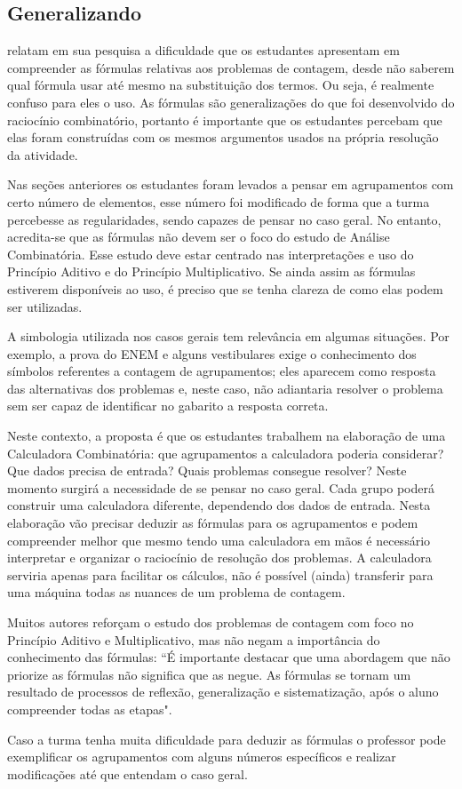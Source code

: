\clearpage
\def\currentcolor{session3}
\begin{texto}
{
\subsection{Generalizando}\small
\cite{Renan} relatam em sua pesquisa a dificuldade que os estudantes apresentam em compreender as fórmulas relativas aos problemas de contagem, desde não saberem qual fórmula usar até mesmo na substituição dos termos. Ou seja, é realmente confuso para eles o uso. As fórmulas são generalizações do que foi desenvolvido do raciocínio combinatório, portanto é importante que os estudantes percebam que elas foram construídas com os mesmos argumentos usados na própria resolução da atividade. 

Nas seções anteriores os estudantes foram levados a pensar em agrupamentos com certo número de elementos, esse número foi modificado de forma que a turma percebesse as regularidades, sendo capazes de pensar no caso geral.
No entanto, acredita-se que as fórmulas não devem ser o foco do estudo de Análise Combinatória. Esse estudo deve estar centrado nas interpretações e uso do Princípio Aditivo e do Princípio Multiplicativo. Se ainda assim as fórmulas estiverem disponíveis ao uso, é preciso que se tenha clareza de como elas podem ser utilizadas. 

A simbologia utilizada nos casos gerais  tem relevância em algumas situações. Por exemplo, a prova do ENEM e alguns vestibulares exige o conhecimento dos símbolos referentes a contagem de agrupamentos; eles aparecem como resposta das alternativas dos problemas e, neste caso, não adiantaria resolver o problema sem ser capaz de identificar no gabarito a resposta correta. 

Neste contexto, a proposta é que os estudantes trabalhem na elaboração de uma Calculadora  Combinatória: que agrupamentos a calculadora poderia considerar? Que dados precisa de entrada? Quais problemas consegue resolver? Neste momento surgirá a necessidade de se pensar no caso geral. Cada grupo poderá construir uma calculadora diferente, dependendo dos dados de entrada. Nesta elaboração vão precisar deduzir as fórmulas para os agrupamentos e podem compreender melhor que mesmo tendo uma calculadora em mãos é necessário interpretar e organizar o raciocínio de resolução dos problemas. A calculadora serviria apenas para facilitar os cálculos, não é possível (ainda) transferir para uma máquina todas as nuances de um problema de contagem. 

Muitos autores reforçam o estudo dos problemas de contagem com foco no Princípio Aditivo e Multiplicativo, mas não negam a importância do conhecimento das fórmulas: ``É importante destacar que uma abordagem que não priorize as fórmulas não significa que as negue. As fórmulas se tornam um resultado de processos de reflexão, generalização e sistematização, após o aluno compreender todas as etapas". \cite[p. 53]{Diogo} 

Caso a turma tenha muita dificuldade para deduzir as fórmulas o professor pode exemplificar os agrupamentos com alguns números específicos e realizar modificações até que entendam o caso geral. 
}
\end{texto}
